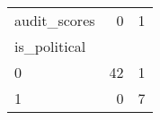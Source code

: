 \begin{tabular}{lrr}
\toprule
audit\_scores &   0 &  1 \\
is\_political &     &    \\
\midrule
0            &  42 &  1 \\
1            &   0 &  7 \\
\bottomrule
\end{tabular}
